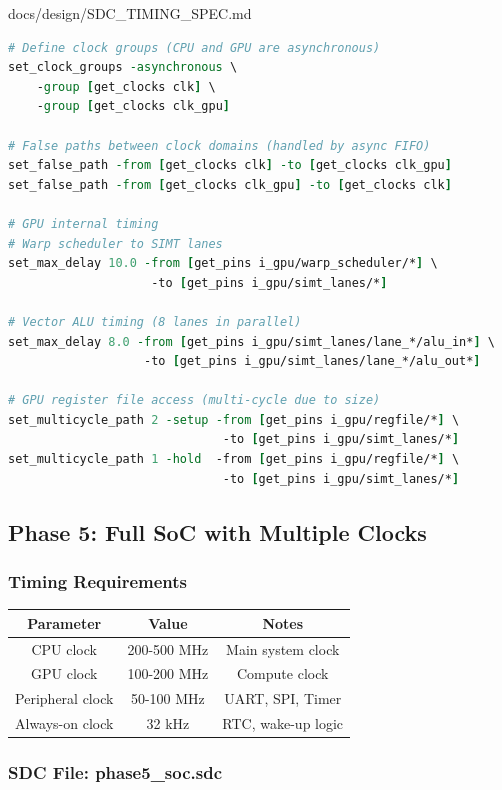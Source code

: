 \begin{relocated}{docs/design/SDC_TIMING_SPEC.md}
\begin{lstlisting}[language=tcl]
# Define clock groups (CPU and GPU are asynchronous)
set_clock_groups -asynchronous \
    -group [get_clocks clk] \
    -group [get_clocks clk_gpu]

# False paths between clock domains (handled by async FIFO)
set_false_path -from [get_clocks clk] -to [get_clocks clk_gpu]
set_false_path -from [get_clocks clk_gpu] -to [get_clocks clk]

# GPU internal timing
# Warp scheduler to SIMT lanes
set_max_delay 10.0 -from [get_pins i_gpu/warp_scheduler/*] \
                    -to [get_pins i_gpu/simt_lanes/*]

# Vector ALU timing (8 lanes in parallel)
set_max_delay 8.0 -from [get_pins i_gpu/simt_lanes/lane_*/alu_in*] \
                   -to [get_pins i_gpu/simt_lanes/lane_*/alu_out*]

# GPU register file access (multi-cycle due to size)
set_multicycle_path 2 -setup -from [get_pins i_gpu/regfile/*] \
                              -to [get_pins i_gpu/simt_lanes/*]
set_multicycle_path 1 -hold  -from [get_pins i_gpu/regfile/*] \
                              -to [get_pins i_gpu/simt_lanes/*]
\end{lstlisting}

\subsection{Phase 5: Full SoC with Multiple Clocks}\label{ds:ch:sdc-timing-spec:phase-5-full-soc-with-multiple-clocks}

\subsubsection{Timing Requirements}\label{ds:ch:sdc-timing-spec:timing-requirements-4}

{
\begin{longtable}[]{@{}ccc@{}}
\toprule\noalign{}
Parameter & Value & Notes \\
\midrule\noalign{}
\endhead
\bottomrule\noalign{}
\endlastfoot
CPU clock & 200-500 MHz & Main system clock \\
GPU clock & 100-200 MHz & Compute clock \\
Peripheral clock & 50-100 MHz & UART, SPI, Timer \\
Always-on clock & 32 kHz & RTC, wake-up logic \\
\end{longtable}
}

\subsubsection{\texorpdfstring{SDC File:
phase5\_\allowbreak{}soc.sdc}{SDC File: phase5\_soc.sdc}}\label{ds:ch:sdc-timing-spec:sdc-file-phase5-socsdc}


\end{relocated}
